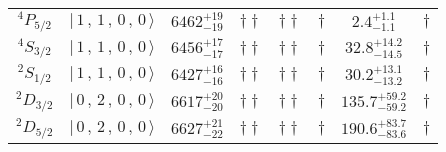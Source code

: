 \begin{tabular}{c| c c c c c c c}
$^{4}P_{5/2}$ & $\vert \,1\,,\,1\,,\,0\,,\,0 \,\rangle $ & $6462^{+19}_{-19}$ & $\dagger\dagger$ & $\dagger\dagger$ & $\dagger$ & $2.4^{+1.1}_{-1.1}$ & $\dagger$ \\ 
$^{4}S_{3/2}$ & $\vert \,1\,,\,1\,,\,0\,,\,0 \,\rangle $ & $6456^{+17}_{-17}$ & $\dagger\dagger$ & $\dagger\dagger$ & $\dagger$ & $32.8^{+14.2}_{-14.5}$ & $\dagger$ \\ 
$^{2}S_{1/2}$ & $\vert \,1\,,\,1\,,\,0\,,\,0 \,\rangle $ & $6427^{+16}_{-16}$ & $\dagger\dagger$ & $\dagger\dagger$ & $\dagger$ & $30.2^{+13.1}_{-13.2}$ & $\dagger$ \\ 
$^{2}D_{3/2}$ & $\vert \,0\,,\,2\,,\,0\,,\,0 \,\rangle $ & $6617^{+20}_{-20}$ & $\dagger\dagger$ & $\dagger\dagger$ & $\dagger$ & $135.7^{+59.2}_{-59.2}$ & $\dagger$ \\ 
$^{2}D_{5/2}$ & $\vert \,0\,,\,2\,,\,0\,,\,0 \,\rangle $ & $6627^{+21}_{-22}$ & $\dagger\dagger$ & $\dagger\dagger$ & $\dagger$ & $190.6^{+83.7}_{-83.6}$ & $\dagger$ \\ 
\hline \hline
\end{tabular}

